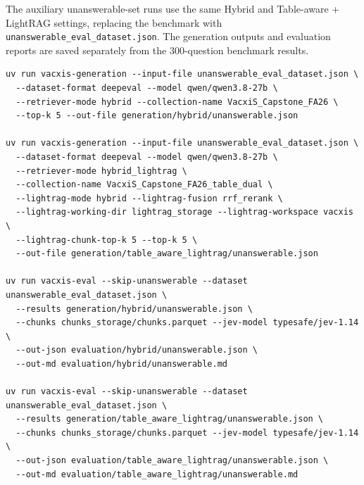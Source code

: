 \documentclass[sn-mathphys, oneside]{sn-jnl}
\newcommand{\artifact}[1]{\nolinkurl{#1}}
\begin{document}
The auxiliary unanswerable-set runs use the same Hybrid and Table-aware + LightRAG settings, replacing the benchmark with \artifact{unanswerable\_eval\_dataset.json}. The generation outputs and evaluation reports are saved separately from the 300-question benchmark results.
\begin{lstlisting}[basicstyle=\ttfamily\scriptsize,breaklines=true,columns=fullflexible]
uv run vacxis-generation --input-file unanswerable_eval_dataset.json \
  --dataset-format deepeval --model qwen/qwen3.8-27b \
  --retriever-mode hybrid --collection-name VacxiS_Capstone_FA26 \
  --top-k 5 --out-file generation/hybrid/unanswerable.json

uv run vacxis-generation --input-file unanswerable_eval_dataset.json \
  --dataset-format deepeval --model qwen/qwen3.8-27b \
  --retriever-mode hybrid_lightrag \
  --collection-name VacxiS_Capstone_FA26_table_dual \
  --lightrag-mode hybrid --lightrag-fusion rrf_rerank \
  --lightrag-working-dir lightrag_storage --lightrag-workspace vacxis \
  --lightrag-chunk-top-k 5 --top-k 5 \
  --out-file generation/table_aware_lightrag/unanswerable.json

uv run vacxis-eval --skip-unanswerable --dataset unanswerable_eval_dataset.json \
  --results generation/hybrid/unanswerable.json \
  --chunks chunks_storage/chunks.parquet --jev-model typesafe/jev-1.14 \
  --out-json evaluation/hybrid/unanswerable.json \
  --out-md evaluation/hybrid/unanswerable.md

uv run vacxis-eval --skip-unanswerable --dataset unanswerable_eval_dataset.json \
  --results generation/table_aware_lightrag/unanswerable.json \
  --chunks chunks_storage/chunks.parquet --jev-model typesafe/jev-1.14 \
  --out-json evaluation/table_aware_lightrag/unanswerable.json \
  --out-md evaluation/table_aware_lightrag/unanswerable.md
\end{lstlisting}
\end{document}
